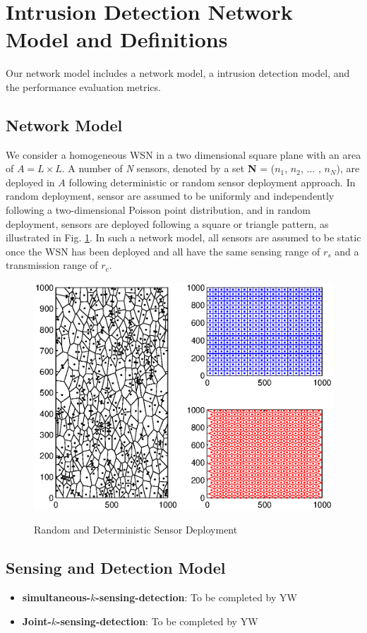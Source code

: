 \documentclass[10pt, conference, compsocconf, twocolumn]{IEEEtran}
\begin{document}
\section{Intrusion Detection Network Model and Definitions}\label{sec:network_model}
Our network model includes a network model, a intrusion detection
model, and the performance evaluation metrics.
\subsection{Network Model} \label{sec:model_A}
We consider a homogeneous WSN in a two dimensional square plane with
an area of $A=L \times L$. A number of \emph{N} sensors, denoted by
a set \textbf{N} = ($n_1$, $n_2$, $...$ , $n_N$), are deployed in
$A$ following deterministic or random sensor deployment approach. In
random deployment, sensor are assumed to be uniformly and
independently following a two-dimensional Poisson point
distribution, and in random deployment, sensors are deployed
following a square or triangle pattern, as illustrated in Fig.
\ref{SquareTriRandomDeployment.eps}. In such a network model, all
sensors are assumed to be static once the WSN has been deployed and
all have the same sensing range of $r_s$ and a transmission range of
$r_c$.

\begin{figure}
  \includegraphics[width=3.2 in]{SquareTriRandomDeployment.eps}\\
  \caption{Random and Deterministic Sensor Deployment}\label{SquareTriRandomDeployment.eps}
\end{figure}


\subsection{Sensing and Detection Model}\label{sec:model_C}
\begin{itemize}
  \item \textbf{simultaneous-$k$-sensing-detection}: To be completed
  by YW
  \item \textbf{Joint-$k$-sensing-detection}: To be completed by YW
\end{itemize}
\end{document}
